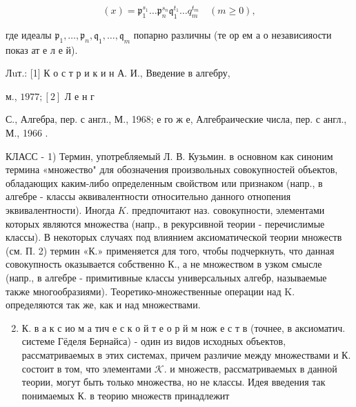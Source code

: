 \documentclass[10pt]{article}
\begin{document}
\[

(x)=\mathfrak{p}_{1}^{s_{1}} \ldots \mathfrak{p}_{n}^{s_{n}} \mathfrak{q}_{1}^{t_{1}} \ldots q_{m}^{t_{m}} \quad(m \geqslant 0),

\]



где идеалы $\mathfrak{p}_{1}, \ldots, \mathfrak{p}_{n}, \mathfrak{q}_{1}, \ldots, \mathfrak{q}_{m}$ попарно различны (те ор ем а о независияости показ ат е л е й).



Лuт.: [1] К о с т р и к и н А. И., Введение в алгебру,

м., $1977 ;[2]$ Л е н г

С., Алгебра, пер. с англ., М., 1968; е го ж е, Алгебраические числа, пер. с англ., М., 1966 .



КЛАСС - 1) Термин, употребляемый Л. В. Кузьмин. в основном как синоним термина «множество" для обозначения произвольных совокупностей объектов, обладающих каким-либо определенным свойством или признаком (напр., в алгебре - классы әквивалентности относительно данного отнопения эквивалентности). Иногда $K$. предпочитают наз. совокупности, элементами которых являются множества (напр., в рекурсивной теории - перечислимые классы). В некоторых случаях под влиянием аксиоматической теории множеств (см. П. 2) термин «К.» применяется для того, чтобы подчеркнуть, что данная совокупность оказывается собственно $К .$, а не множеством в узком смысле (напр., в алгебре - примитивные классы универсальных алгебр, называемые также многообразиями). Теоретико-множественные операции над $\mathrm{K}$. определяются так же, как и над множествами.



\begin{enumerate}

  \setcounter{enumi}{1}

  \item К. в а к с ио м а тич е с к о й т е о р й м нож е с т в (точнее, в аксиоматич. системе Гёделя Бернайса) - один из видов исходных объектов, рассматриваемых в этих системах, причем различие между множествами и $К$. состоит в том, что элементами $\mathcal{K}$. и множеств, рассматриваемых в данной теории, могут быть только множества, но не классы. Идея введения так понимаемых К. в теорию множеств принадлежит

\end{enumerate}
\end{document}

